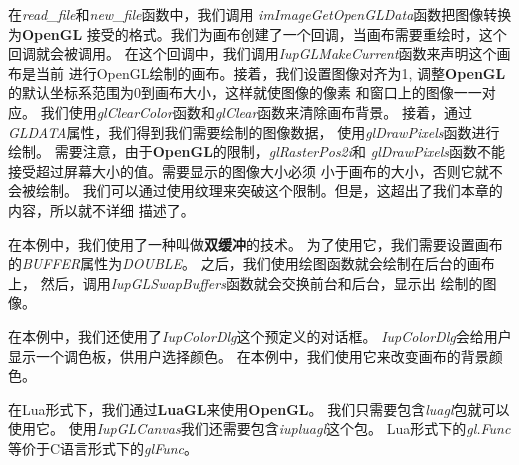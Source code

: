 \documentclass{ctexart}
\begin{document}
在\emph{read\_file}和\emph{new\_file}函数中，我们调用
\emph{imImageGetOpenGLData}函数把图像转换为\textbf{OpenGL}
接受的格式。我们为画布创建了一个回调，当画布需要重绘时，这个回调就会被调用。
在这个回调中，我们调用\emph{IupGLMakeCurrent}函数来声明这个画布是当前
进行OpenGL绘制的画布。接着，我们设置图像对齐为1,
调整\textbf{OpenGL}的默认坐标系范围为$0$到画布大小，这样就使图像的像素
和窗口上的图像一一对应。
我们使用\emph{glClearColor}函数和\emph{glClear}函数来清除画布背景。
接着，通过\emph{GLDATA}属性，我们得到我们需要绘制的图像数据，
使用\emph{glDrawPixels}函数进行绘制。
需要注意，由于\textbf{OpenGL}的限制，\emph{glRasterPos2i}和
\emph{glDrawPixels}函数不能接受超过屏幕大小的值。需要显示的图像大小必须
小于画布的大小，否则它就不会被绘制。
我们可以通过使用纹理来突破这个限制。但是，这超出了我们本章的内容，所以就不详细
描述了。

在本例中，我们使用了一种叫做\textbf{双缓冲}的技术。
为了使用它，我们需要设置画布的\emph{BUFFER}属性为\emph{DOUBLE}。
之后，我们使用绘图函数就会绘制在后台的画布上，
然后，调用\emph{IupGLSwapBuffers}函数就会交换前台和后台，显示出
绘制的图像。

在本例中，我们还使用了\emph{IupColorDlg}这个预定义的对话框。
\emph{IupColorDlg}会给用户显示一个调色板，供用户选择颜色。
在本例中，我们使用它来改变画布的背景颜色。

在Lua形式下，我们通过\textbf{LuaGL}来使用\textbf{OpenGL}。
我们只需要包含\emph{luagl}包就可以使用它。
使用\emph{IupGLCanvas}我们还需要包含\emph{iupluagl}这个包。
Lua形式下的\emph{gl.Func}等价于C语言形式下的\emph{glFunc}。
\end{document}
